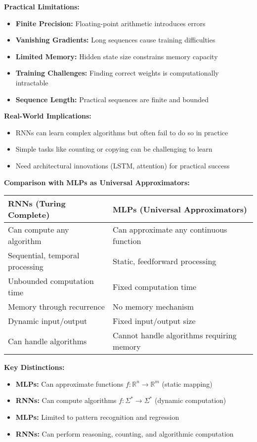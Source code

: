 \documentclass[12pt]{article}
\begin{document}
\begin{enumerate}[(a)]
{    \textbf{Practical Limitations:}
    \begin{itemize}
        \item \textbf{Finite Precision:} Floating-point arithmetic introduces errors
        \item \textbf{Vanishing Gradients:} Long sequences cause training difficulties
        \item \textbf{Limited Memory:} Hidden state size constrains memory capacity
        \item \textbf{Training Challenges:} Finding correct weights is computationally intractable
        \item \textbf{Sequence Length:} Practical sequences are finite and bounded
    \end{itemize}
    
    \textbf{Real-World Implications:}
    \begin{itemize}
        \item RNNs can learn complex algorithms but often fail to do so in practice
        \item Simple tasks like counting or copying can be challenging to learn
        \item Need architectural innovations (LSTM, attention) for practical success
    \end{itemize}
    
    \textbf{Comparison with MLPs as Universal Approximators:}
    
    \begin{tabular}{|p{5cm}|p{5cm}|}
    \hline
    \textbf{RNNs (Turing Complete)} & \textbf{MLPs (Universal Approximators)} \\
    \hline
    Can compute any algorithm & Can approximate any continuous function \\
    \hline
    Sequential, temporal processing & Static, feedforward processing \\
    \hline
    Unbounded computation time & Fixed computation time \\
    \hline
    Memory through recurrence & No memory mechanism \\
    \hline
    Dynamic input/output & Fixed input/output size \\
    \hline
    Can handle algorithms & Cannot handle algorithms requiring memory \\
    \hline
    \end{tabular}
    
    \textbf{Key Distinctions:}
    \begin{itemize}
        \item \textbf{MLPs:} Can approximate functions $f: \mathbb{R}^n \to \mathbb{R}^m$ (static mapping)
        \item \textbf{RNNs:} Can compute algorithms $f: \Sigma^* \to \Sigma^*$ (dynamic computation)
        \item \textbf{MLPs:} Limited to pattern recognition and regression
        \item \textbf{RNNs:} Can perform reasoning, counting, and algorithmic computation
    \end{itemize}
    
}
\end{enumerate}
\end{document}
